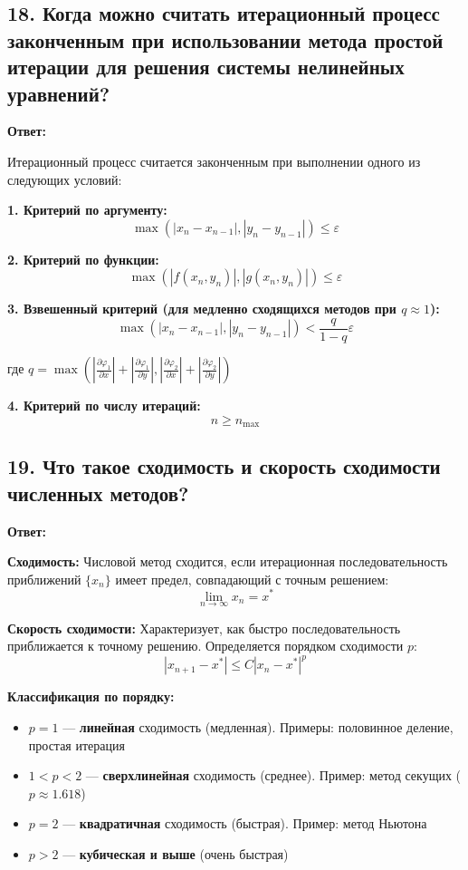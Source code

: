 \documentclass[a4paper,12pt]{article}
\begin{document}
\subsection*{18. Когда можно считать итерационный процесс законченным при использовании метода простой итерации для решения системы нелинейных уравнений?}

\textbf{Ответ:} 

Итерационный процесс считается законченным при выполнении одного из следующих условий:

\textbf{1. Критерий по аргументу:}
\[
    \max(|x_n - x_{n-1}|, |y_n - y_{n-1}|) \leq \varepsilon
\]

\textbf{2. Критерий по функции:}
\[
    \max(|f(x_n, y_n)|, |g(x_n, y_n)|) \leq \varepsilon
\]

\textbf{3. Взвешенный критерий (для медленно сходящихся методов при $q \approx 1$):}
\[
    \max(|x_n - x_{n-1}|, |y_n - y_{n-1}|) < \frac{q}{1-q} \varepsilon
\]

где $q = \max\left( \left| \frac{\partial \varphi_1}{\partial x} \right| + \left| \frac{\partial \varphi_1}{\partial y} \right|,  \left| \frac{\partial \varphi_2}{\partial x} \right| + \left| \frac{\partial \varphi_2}{\partial y} \right| \right)$

\textbf{4. Критерий по числу итераций:}
\[
    n \geq n_{\max}
\]

\subsection*{19. Что такое сходимость и скорость сходимости численных методов?}

\textbf{Ответ:} 

\textbf{Сходимость:} Числовой метод сходится, если итерационная последовательность приближений $\{x_n\}$ имеет предел, совпадающий с точным решением:
\[
    \lim_{n \to \infty} x_n = x^*
\]

\textbf{Скорость сходимости:} Характеризует, как быстро последовательность приближается к точному решению. Определяется порядком сходимости $p$:
\[
    |x_{n+1} - x^*| \leq C |x_n - x^*|^p
\]

\textbf{Классификация по порядку:}
\begin{itemize}
    \item $p = 1$ --- \textbf{линейная} сходимость (медленная). Примеры: половинное деление, простая итерация
    \item $1 < p < 2$ --- \textbf{сверхлинейная} сходимость (среднее). Пример: метод секущих ($p \approx 1.618$)
    \item $p = 2$ --- \textbf{квадратичная} сходимость (быстрая). Пример: метод Ньютона
    \item $p > 2$ --- \textbf{кубическая и выше} (очень быстрая)
\end{itemize}
\end{document}
